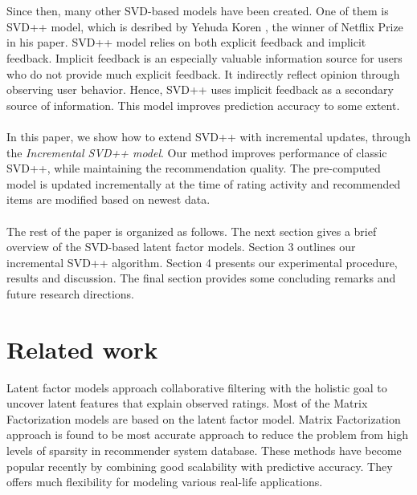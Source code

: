 \documentclass[conference]{IEEEtran}
\begin{document}
\\\\
Since then, many other SVD-based models have been created. One of them is SVD++ model, which is desribed by Yehuda Koren , the winner of Netflix Prize in his paper. SVD++ model relies on both explicit feedback and implicit feedback\cite{BellKorFactor}. Implicit feedback is an especially valuable information source for users who do not provide much explicit feedback. It indirectly reflect opinion through observing user behavior. Hence, SVD++ uses implicit feedback as a secondary source of information. This model improves prediction accuracy to some extent.
\\\\
In this paper, we show how to extend SVD++ with incremental updates, through the \emph{Incremental SVD++ model}. Our method improves performance of classic SVD++, while maintaining the recommendation quality. The pre-computed model is updated incrementally at the time of rating activity and recommended items are modified based on newest data.
\\\\
The rest of the paper is organized as follows. The next section gives a brief overview of the SVD-based latent factor models. Section 3 outlines our incremental SVD++ algorithm. Section 4 presents our experimental procedure, results and discussion. The final section provides some concluding remarks and future research directions.

\section{Related work}
Latent factor models approach collaborative filtering with the holistic goal to uncover
latent features that explain observed ratings. Most of the Matrix Factorization models are based on the latent factor model\cite{KorenMatrix}. Matrix Factorization approach is found to be most accurate approach to reduce the problem from high levels of sparsity in recommender system database. These methods have become popular recently by combining good scalability with predictive accuracy. They offers much flexibility for modeling various real-life applications.
\end{document}
